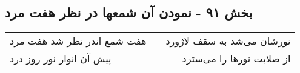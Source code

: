 \begin{center}
\section*{بخش ۹۱ - نمودن آن شمعها در نظر هفت مرد}
\label{sec:sh091}
\begin{longtable}{l p{0.5cm} r}
هفت شمع اندر نظر شد هفت مرد
&&
نورشان می‌شد به سقف لاژورد
\\
پیش آن انوار نور روز درد
&&
از صلابت نورها را می‌سترد
\\
\end{longtable}
\end{center}
